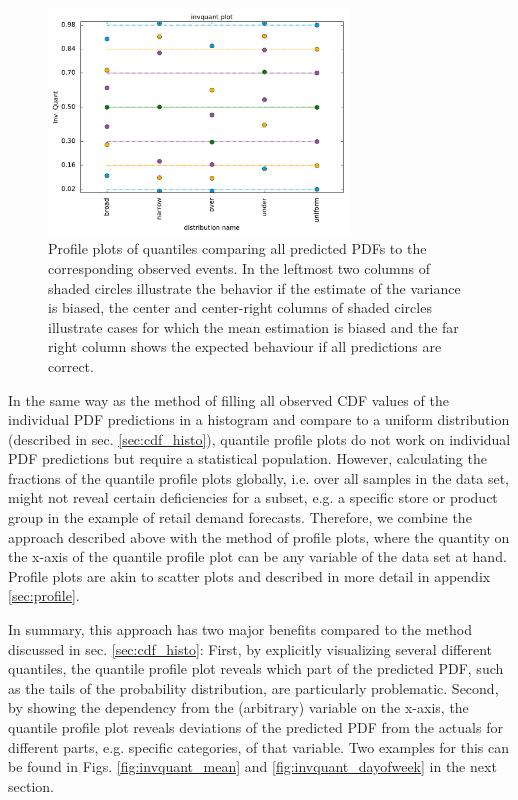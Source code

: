 \documentclass[BCOR=1mm, DIV=calc,10pt,
twoside=true,
twocolumn,
headings=normal]{scrartcl}
\begin{document}
\begin{figure}
\begin{center}
\includegraphics[width=8cm]{../figures/invquant_profiles}
\caption{\label{fig:quant_profiles} Profile plots of quantiles comparing all predicted PDFs to the corresponding observed events. In the leftmost two columns of shaded circles illustrate the behavior if the estimate of the variance is biased, the center and center-right columns of shaded circles illustrate cases for which the mean estimation is biased and the far right column shows the expected behaviour if all predictions are correct.}
\end{center}
\end{figure}

In the same way as the method of filling all observed CDF values of the individual PDF predictions in a histogram and compare to a uniform distribution (described in sec. \ref{sec:cdf_histo}), quantile profile plots do not work on individual PDF predictions but require a statistical population. However, calculating the fractions of the quantile profile plots globally, i.e. over all samples in the data set, might not reveal certain deficiencies for a subset, e.g. a specific store or product group in the example of retail demand forecasts. Therefore, we combine the approach described above with the method of profile plots, where the quantity on the x-axis of the quantile profile plot can be any variable of the data set at hand. Profile plots are akin to scatter plots and described in more detail in appendix \ref{sec:profile}.

In summary, this approach has two major benefits compared to the method discussed in sec. \ref{sec:cdf_histo}: First, by explicitly visualizing several different quantiles, the quantile profile plot reveals which part of the predicted PDF, such as the tails of the probability distribution, are particularly problematic. Second, by showing the dependency from the (arbitrary) variable on the x-axis, the quantile profile plot reveals deviations of the predicted PDF from the actuals for different parts, e.g. specific categories, of that variable. Two examples for this can be found in Figs. \ref{fig:invquant_mean} and \ref{fig:invquant_dayofweek} in the next section.
\end{document}
